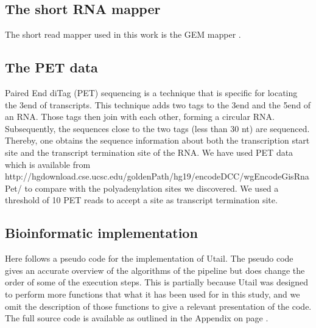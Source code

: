 \subsection{The short RNA mapper}
The short read mapper used in this work is the GEM mapper
\cite{marco-sola_gem_2012}.

\subsection{The PET data}
Paired End diTag (PET) sequencing is a technique that is specific for locating
the 3\ppp end of transcripts. This technique adds two tags to the 3\ppp end and
the 5\ppp end of an RNA. Those tags then join with each other, forming a
circular RNA. Subsequently, the sequences close to the two tags (less than 30
nt) are sequenced. Thereby, one obtains the sequence information about both the
transcription start site and the transcript termination site of the RNA. We
have used PET data which is available from
http://hgdownload.cse.ucsc.edu/goldenPath/hg19/encodeDCC/wgEncodeGisRnaPet/ to
compare with the polyadenylation sites we discovered. We used a threshold of 10
PET reads to accept a site as transcript termination site.

\subsection{Bioinformatic implementation}
Here follows a pseudo code for the implementation of Utail. The pseudo
code gives an accurate overview of the algorithms of the pipeline but does
change the order of some of the execution steps. This is partially because
Utail was designed to perform more functions that what it has been used for in
this study, and we omit the description of those functions to give a relevant
presentation of the code. The full source code is available as outlined in the
Appendix on page \pageref{source_code}.

\inputminted[fontsize=\small]{python}{pseudo_code/utail.py}
